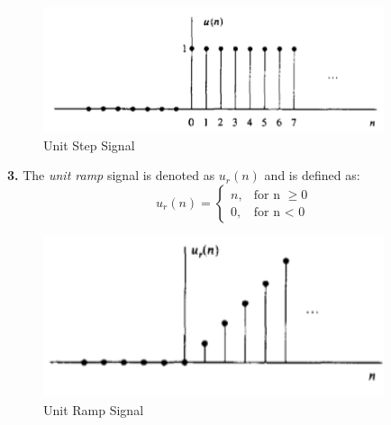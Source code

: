 \documentclass{article} %
\begin{document}
    \begin{figure}[h]
    \centering
	\includegraphics[width=10cm]{step}
	\caption{Unit Step Signal}
	\end{figure}
	
	\textbf{3.} The \textit{unit ramp} signal is denoted as $u_r(n)$ and is defined as:
	\begin{equation}
 	 u_r(n) =
    	\begin{cases}
      	n, & \text{for n } \ge { 0}\\
      	0, & \text{for n < 0}
    	\end{cases}       
	\end{equation}
    
    \begin{figure}[h]
    \centering
	\includegraphics[width=10cm]{ramp}
	\caption{Unit Ramp Signal}
	\end{figure}
	
\end{document}
